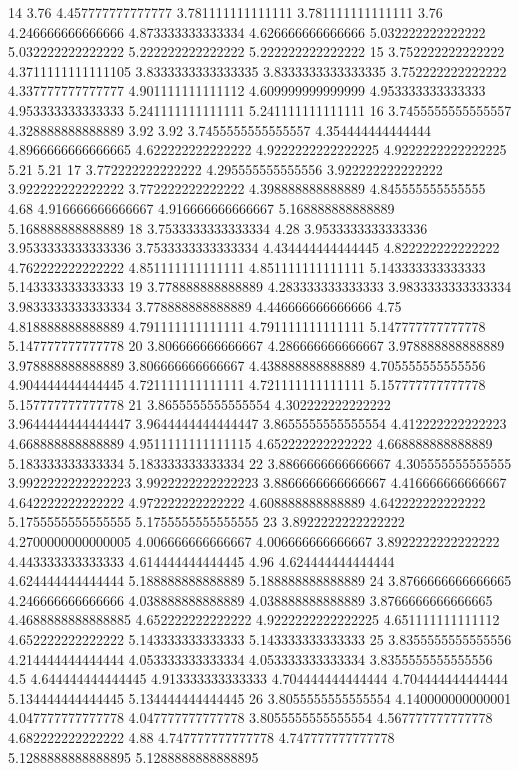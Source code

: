14 3.76 4.457777777777777 3.781111111111111 3.781111111111111 3.76 4.246666666666666 4.873333333333334 4.626666666666666 5.032222222222222 5.032222222222222 5.222222222222222 5.222222222222222
15 3.752222222222222 4.3711111111111105 3.8333333333333335 3.8333333333333335 3.752222222222222 4.337777777777777 4.901111111111112 4.609999999999999 4.953333333333333 4.953333333333333 5.241111111111111 5.241111111111111
16 3.7455555555555557 4.328888888888889 3.92 3.92 3.7455555555555557 4.354444444444444 4.8966666666666665 4.622222222222222 4.9222222222222225 4.9222222222222225 5.21 5.21
17 3.772222222222222 4.295555555555556 3.922222222222222 3.922222222222222 3.772222222222222 4.398888888888889 4.845555555555555 4.68 4.916666666666667 4.916666666666667 5.168888888888889 5.168888888888889
18 3.7533333333333334 4.28 3.9533333333333336 3.9533333333333336 3.7533333333333334 4.434444444444445 4.822222222222222 4.762222222222222 4.851111111111111 4.851111111111111 5.143333333333333 5.143333333333333
19 3.778888888888889 4.283333333333333 3.9833333333333334 3.9833333333333334 3.778888888888889 4.446666666666666 4.75 4.818888888888889 4.791111111111111 4.791111111111111 5.147777777777778 5.147777777777778
20 3.806666666666667 4.286666666666667 3.978888888888889 3.978888888888889 3.806666666666667 4.438888888888889 4.705555555555556 4.904444444444445 4.721111111111111 4.721111111111111 5.157777777777778 5.157777777777778
21 3.8655555555555554 4.302222222222222 3.9644444444444447 3.9644444444444447 3.8655555555555554 4.412222222222223 4.668888888888889 4.9511111111111115 4.652222222222222 4.668888888888889 5.183333333333334 5.183333333333334
22 3.8866666666666667 4.305555555555555 3.9922222222222223 3.9922222222222223 3.8866666666666667 4.416666666666667 4.642222222222222 4.972222222222222 4.608888888888889 4.642222222222222 5.1755555555555555 5.1755555555555555
23 3.8922222222222222 4.2700000000000005 4.006666666666667 4.006666666666667 3.8922222222222222 4.443333333333333 4.614444444444445 4.96 4.624444444444444 4.624444444444444 5.188888888888889 5.188888888888889
24 3.8766666666666665 4.246666666666666 4.038888888888889 4.038888888888889 3.8766666666666665 4.4688888888888885 4.652222222222222 4.9222222222222225 4.651111111111112 4.652222222222222 5.143333333333333 5.143333333333333
25 3.8355555555555556 4.214444444444444 4.053333333333334 4.053333333333334 3.8355555555555556 4.5 4.644444444444445 4.913333333333333 4.704444444444444 4.704444444444444 5.134444444444445 5.134444444444445
26 3.8055555555555554 4.140000000000001 4.047777777777778 4.047777777777778 3.8055555555555554 4.567777777777778 4.682222222222222 4.88 4.747777777777778 4.747777777777778 5.1288888888888895 5.1288888888888895
